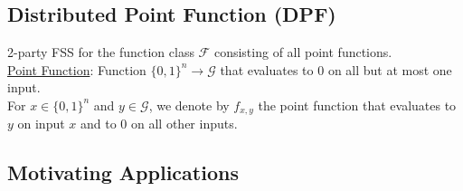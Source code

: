 \subsection{Distributed Point Function (DPF)}
2-party FSS for the function class $\mathcal{F}$ consisting of all point functions.\\

\underline{Point Function}: Function $\{0, 1\}^n \rightarrow \mathcal{G}$ that evaluates to 0 on all but at most one input. \\

For $x \in \{0, 1\}^n$ and $y \in \mathcal{G}$, we denote by $f_{x, y}$ the point function that evaluates to $y$ on input $x$ and to $0$ on all other inputs.

\subsection{Motivating Applications}
